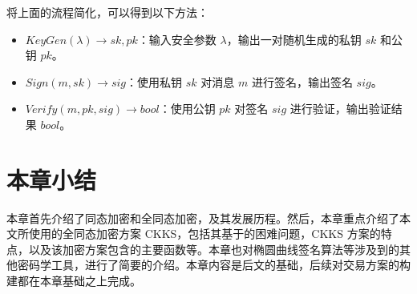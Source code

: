 将上面的流程简化，可以得到以下方法：

\begin{itemize}
    \item $KeyGen(\lambda) \rightarrow sk, pk$：输入安全参数 $\lambda$，输出一对随机生成的私钥 $sk$ 和公钥 $pk$。
    \item $Sign(m, sk) \rightarrow sig$：使用私钥 $sk$ 对消息 $m$ 进行签名，输出签名 $sig$。
    \item $Verify(m, pk, sig) \rightarrow bool$：使用公钥 $pk$ 对签名 $sig$ 进行验证，输出验证结果 $bool$。
\end{itemize}

\section{本章小结}

本章首先介绍了同态加密和全同态加密，及其发展历程。然后，本章重点介绍了本文所使用的全同态加密方案 CKKS，包括其基于的困难问题，CKKS 方案的特点，以及该加密方案包含的主要函数等。本章也对椭圆曲线签名算法等涉及到的其他密码学工具，进行了简要的介绍。本章内容是后文的基础，后续对交易方案的构建都在本章基础之上完成。
